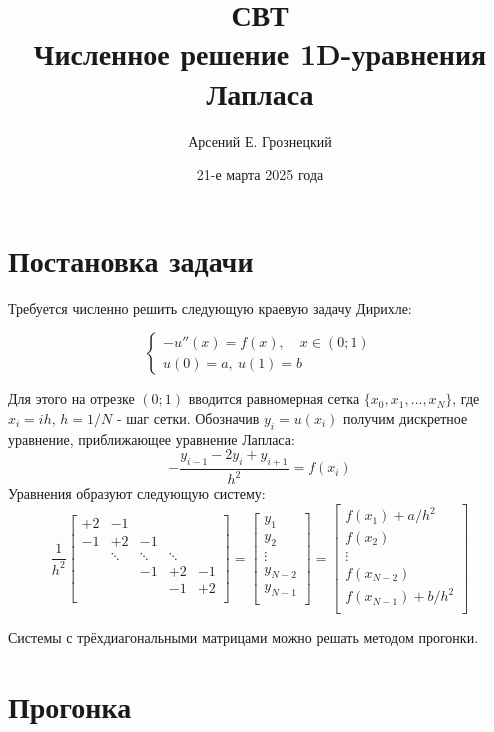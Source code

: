 \documentclass{article}
\title{\textbf{СВТ}\\ \textbf{Численное решение 1D-уравнения Лапласа} }
\author{Арсений Е. Грознецкий}
\date{21-е марта 2025 года}
\begin{document}
\maketitle
\tableofcontents

\newpage

\section{Постановка задачи}

Требуется численно решить следующую краевую задачу Дирихле:

$$
\begin{cases}
-u''(x) = f(x), \quad x \in (0; 1) \\
u(0) = a, \: u(1) = b
\end{cases}
$$

Для этого на отрезке $(0; 1)$ вводится равномерная сетка $\{x_0, x_1, \ldots, x_N\}$, где $x_i = ih$, $h = 1 / N$ - шаг сетки. Обозначив $y_i = u(x_i)$ получим дискретное уравнение, приближающее уравнение Лапласа:
$$-\frac{y_{i-1} -2y_i + y_{i+1}}{h^2} = f(x_i)$$
Уравнения образуют следующую систему:
$$\frac{1}{h^2}
\begin{bmatrix}
+2 & -1   &      &      &     \\
-1 & +2   &  -1  &      &     \\
   &\ddots&\ddots&\ddots&     \\
   &      &  -1  &  +2  &  -1 \\
   &      &      &  -1  &  +2 \\
\end{bmatrix} = \begin{bmatrix}
y_1 \\
y_2 \\ 
\vdots \\
y_{N-2} \\
y_{N-1} \\
\end{bmatrix} = \begin{bmatrix}
f(x_1) + a / h^2 \\
f(x_2) \\ 
\vdots \\
f(x_{N-2}) \\
f(x_{N-1}) + b / h^2 \\
\end{bmatrix} $$

Системы с трёхдиагональными матрицами можно решать методом прогонки.


\section{Прогонка}
\end{document}
